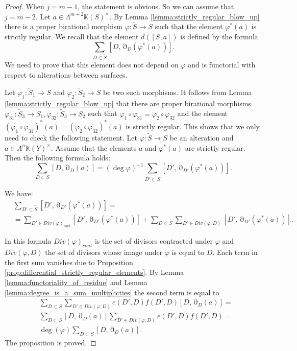 \documentclass[12pt]{extarticle}
\def\mb{\mathbb}
\def\k{\mb K}
\def\ph{\varphi}
\def\cl{\colon}
\def\wt{\widetilde}
\newcommand{\EP}[2]{{\Lambda^{#1}\k(#2)^\times}}
\DeclareMathOperator{\ts}{\partial}
\begin{document}
\begin{proof}
When $j=m-1$, the statement is obvious. So we can assume that $j=m-2$. Let $a\in\EP{m+2}{S}$. By Lemma \ref{lemma:strictly_regular_blow_up} there is a proper birational morphism $\ph\colon \wt S\to S$ such that  the element $\ph^*(a)$ is strictly regular.
We recall that the element $d([S, a])$ is defined by the formula
$$\sum\limits_{D\subset \wt S}[D,\ts_{D}(\ph^*(a))].$$
We need to prove that this element does not depend on $\ph$ and is functorial with respect to alterations between surfaces. 

Let $\ph_1\colon \wt S_1\to S$ and $\ph_2\cl\wt S_2\to S$ be two such morphisms. It follows from Lemma \ref{lemma:strictly_regular_blow_up} that there are proper birational morphisms $\ph_{31}\colon \wt S_3\to S_1, \ph_{32}\colon\wt S_{3}\to S_2$ such that $\ph_1\circ\ph_{31}=\ph_{2}\circ\ph_{32}$ and the element $(\ph_{1}\circ\ph_{31})^*(a)=(\ph_{2}\circ\ph_{32})^*(a)$ is strictly regular. This shows that we only need to check the following statement. Let $\ph\colon \wt S\to S$ be an alteration and $a\in \EP{n}{Y}$. Assume that the elements $a$ and $\ph^*(a)$ are strictly regular. Then the following formula holds:
$$\sum\limits_{D\subset S}[D, 
\ts_D(a)]=(\deg \varphi)^{-1}\sum\limits_{D'\subset \wt S}[D',\ts_{D'}(\ph^*(a))].$$

We have:
\begin{align*}
          &\sum\limits_{D'\subset \wt S}[D',\ts_{D'}(\ph^*(a))]=\\
          &=\sum\limits_{D'\in Div(\ph)_{cont}}[D',\ts_{D'}(\ph^*(a))]+\sum\limits_{D\subset S}\sum\limits_{D'\in Div(\ph, D)}[D',\ts_{D'}(\ph^*(a))].
\end{align*}

In this formula $Div(\ph)_{cont}$ is the set of divisors contracted under $\ph$ and $Div(\varphi, D)$ the set of divisors whose image under $\varphi$ is equal to $D$. Each term in the first sum vanishes due to Proposition  \ref{prop:differential_strictly_regular_elements}. By Lemma \ref{lemma:functoriality_of_residue} and Lemma \ref{lemma:degree_is_a_sum_multiplicties}   the second term is equal to
        \begin{align*}
            &\sum\limits_{D\subset S}\sum\limits_{D'\in Div(\ph, D)}e(D', D)f(D',D)[D,\ts_{D}(a)]=\\&\sum\limits_{D\subset S}[D,\ts_{D}(a)]\sum\limits_{D'\in Div(\ph, D)}e(D', D)f(D',D)=\\
            &\deg(\ph)\sum\limits_{D\subset S}[D,\ts_{D}(a)].
        \end{align*}
        The proposition is proved.
\end{proof}
\end{document}
